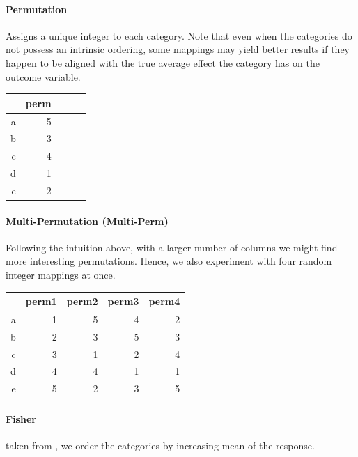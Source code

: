 \documentclass{article}
\theoremstyle{plain}
\theoremstyle{definition}
\theoremstyle{remark}
\begin{document}
\paragraph{Permutation} Assigns a unique integer to each category. Note that even when the categories do not possess an intrinsic ordering, some mappings may yield better results if they happen to be aligned with the true average effect the category has on the outcome variable.


\begin{table}[H]
	\centering
	\begin{tabular}{rrrrr}
		\hline
		& perm  \\
		\hline
		a & 5  \\
		b & 3  \\
		c & 4  \\
		d & 1 \\
		e & 2  \\
		\hline
	\end{tabular}
\end{table}



\paragraph{Multi-Permutation (Multi-Perm)} Following the intuition above, with a larger number of columns we might find more interesting permutations. Hence, we also experiment with four random integer mappings at once.

\begin{table}[H]
	\centering
	\begin{tabular}{rrrrr}
		\hline
		& perm1 & perm2 & perm3 & perm4 \\
		\hline
		a & 1 & 5 & 4 & 2 \\
		b & 2 & 3 & 5 & 3 \\
		c & 3 & 1 & 2 & 4 \\
		d & 4 & 4 & 1 & 1 \\
		e & 5 & 2 & 3 & 5 \\
		\hline
	\end{tabular}
\end{table}

\paragraph{Fisher} taken from \cite{hastie2009elements}, we order the categories by increasing mean of the response.\\
\end{document}
